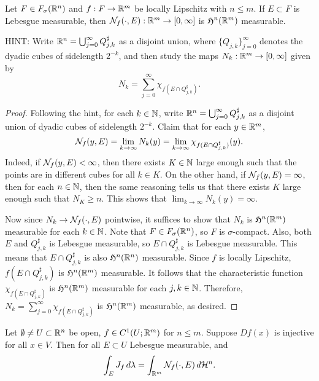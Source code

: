 \documentclass[a4paper]{article}
\renewcommand{\cupinfj}{\bigcup_{j=0}^\infty}
\renewcommand{\suminfj}{\sum_{j=0}^\infty}
\begin{document}
\begin{thm}
Let $F \in F_\sigma(\mathbb{R}^n)$ and $f: F \to \mathbb{R}^m$ be locally
Lipschitz with $n \leq m$. If $E \subset F$ is Lebesgue
measurable, then $\mathcal{N}_f(\cdot, E) : \mathbb{R}^m \to [0, \infty]$
is $\mathfrak{H}^n(\mathbb{R}^m)$ measurable.
\end{thm}

HINT: Write $\mathbb{R}^n = \bigcup_{j=0}^\infty 
Q_{j,k}^\sharp$ as a disjoint union, where 
$\{Q_{j,k}\}_{j=0}^\infty$ denotes the dyadic cubes of 
sidelength $2^{-k}$, and then study the maps $N_k : \mathbb{R}^m 
\to [0,\infty]$ given by 
\[
N_k = \sum_{j=0}^\infty \chi_{f(E \cap Q_{j,k}^\sharp)}.
\]

\begin{proof}
Following the hint, for each $k \in \mathbb{N}$, write 
$\R^n = \cupinfj Q_{j, k}^\sharp$
as a disjoint union of dyadic cubes of sidelength $2^{-k}$.
Claim that for each $y \in \mathbb{R}^m$, 
\[
\mathcal{N}_f (y, E) = \lim_{k \to \infty} N_k(y)
= \lim_{k \to \infty} \chi_{f(E \cap Q_{j, k}^\sharp)}(y).
\]
Indeed, if $\mathcal{N}_f(y, E) < \infty$, then there exists 
$K \in \mathbb{N}$ large enough such that the points are in 
different cubes for all $k \in K$. On the other hand, 
if $\mathcal{N}_f(y, E) = \infty$, then for each $n \in \mathbb{N}$, 
then the same reasoning tells us that 
there exists $K$ large enough such that $N_K \geq n$. 
This shows that $\lim_{k \to \infty} N_k(y) = \infty$.

Now since $N_k \to \mathcal{N}_f(\cdot, E)$ pointwise, it suffices 
to show that $N_k$ is $\mathfrak{H}^n(\mathbb{R}^m)$ measurable 
for each $k \in \mathbb{N}$. Note that $F \in F_\sigma(\mathbb{R}^n)$, so 
$F$ is $\sigma$-compact. Also, both $E$ 
and $Q_{j, k}^\sharp$ is Lebesgue measurable, so 
$E \cap Q_{j, k}^\sharp$ is Lebesgue measurable. 
This means that $E \cap Q_{j, k}^\sharp$ is also 
$\mathfrak{H}^n(\mathbb{R}^n)$ measurable. Since $f$ is locally Lipschitz, 
$f(E \cap Q_{j, k}^\sharp)$ is $\mathfrak{H}^n(\mathbb{R}^m)$ measurable. It
follows that the characteristic function 
$\chi_{f(E \cap Q_{j, k}^\sharp)}$ is $\mathfrak{H}^n 
(\mathbb{R}^m)$ measurable for each $j, k \in \mathbb{N}$. Therefore, 
$N_k = \suminfj \chi_{f(E \cap Q_{j, k}^\sharp)}$ is 
$\mathfrak{H}^n(\mathbb{R}^m)$ measurable, as desired.
\end{proof}

\begin{lemma}
Let $\emptyset \neq U \subset \mathbb{R}^n$ be open, $f \in C^1
(U ; \mathbb{R}^m)$ for $n \leq m$. Suppose $Df(x)$ is injective
for all $x \in V$. Then for all $E \subset U$ Lebesgue
measurable, and
\[
\int_E J_f \, d \lambda = \int_{\mathbb{R}^m} \mathcal{N}_f (\cdot, E) \, d \mathcal{H}^n.
\]
\end{lemma}
\end{document}
